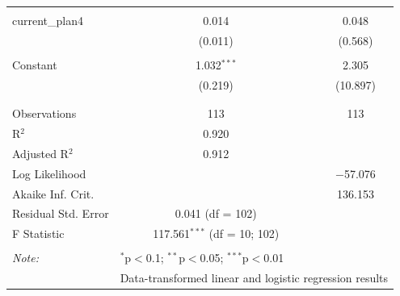 \documentclass[
]{article}
\begin{document}
\begin{table}[!htbp]
\begin{tabular}{@{\extracolsep{5pt}}lcc}
  & & \\ 
 current\_plan4 & 0.014 & 0.048 \\ 
  & (0.011) & (0.568) \\ 
  & & \\ 
 Constant & 1.032$^{***}$ & 2.305 \\ 
  & (0.219) & (10.897) \\ 
  & & \\ 
\hline \\[-1.8ex] 
Observations & 113 & 113 \\ 
R$^{2}$ & 0.920 &  \\ 
Adjusted R$^{2}$ & 0.912 &  \\ 
Log Likelihood &  & $-$57.076 \\ 
Akaike Inf. Crit. &  & 136.153 \\ 
Residual Std. Error & 0.041 (df = 102) &  \\ 
F Statistic & 117.561$^{***}$ (df = 10; 102) &  \\ 
\hline 
\hline \\[-1.8ex] 
\textit{Note:}  & \multicolumn{2}{l}{$^{*}$p$<$0.1; $^{**}$p$<$0.05; $^{***}$p$<$0.01} \\ 
 & \multicolumn{2}{l}{Data-transformed linear and logistic regression results} \\ 
\end{tabular} 
\end{table}
\end{document}
